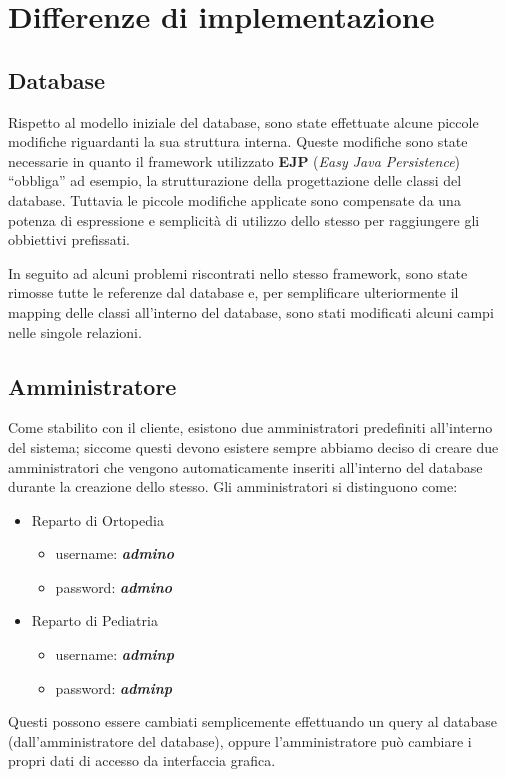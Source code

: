 \section{Differenze di implementazione}\label{sec:ddimpl}


\subsection{Database}

Rispetto al modello iniziale del database, sono state effettuate alcune
piccole modifiche riguardanti la sua struttura interna. Queste modifiche
sono state necessarie in quanto il framework utilizzato \textbf{EJP}
(\emph{Easy Java Persistence}) ``obbliga'' ad esempio,  la strutturazione della 
progettazione delle classi del database.
Tuttavia le piccole modifiche applicate sono compensate da una potenza
di espressione e semplicità di utilizzo dello stesso per raggiungere
gli obbiettivi prefissati.

In seguito ad alcuni problemi riscontrati nello stesso framework,
sono state rimosse tutte le referenze dal database e, per semplificare
ulteriormente il mapping delle classi all'interno del database, sono
stati modificati alcuni campi nelle singole relazioni.



\subsection{Amministratore}

Come stabilito con il cliente, esistono due amministratori predefiniti
all'interno del sistema; siccome questi devono esistere sempre abbiamo
deciso di creare due amministratori che vengono automaticamente inseriti
all'interno del database durante la creazione dello stesso. Gli amministratori
si distinguono come:
\begin{itemize}
\item Reparto di Ortopedia

\begin{itemize}
\item username:\emph{ }\textbf{\emph{admino}}
\item password: \textbf{\emph{admino}}
\end{itemize}
\item Reparto di Pediatria

\begin{itemize}
\item username: \textbf{\emph{adminp}}
\item password:\emph{ }\textbf{\emph{adminp}}
\end{itemize}
\end{itemize}
Questi possono essere cambiati semplicemente effettuando un query
al database (dall'amministratore del database), oppure l'amministratore
può cambiare i propri dati di accesso da interfaccia grafica.


